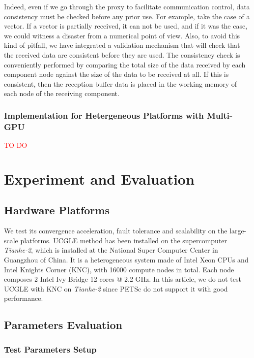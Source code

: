 Indeed, even if we go through the proxy to facilitate communication control, data consistency must be checked before any prior use. For example, take the case of a vector. If a vector is partially received, it can not be used, and if it was the case, we could witness a disaster from a numerical point of view. Also, to avoid this kind of pitfall, we have integrated a validation mechanism that will check that the received data are consistent before they are used. The consistency check is conveniently performed by comparing the total size of the data received by each component node against the size of the data to be received at all. If this is consistent, then the reception buffer data is placed in the working memory of each node of the receiving component.

\subsubsection{Implementation for Hetergeneous Platforms with Multi-GPU}

\textcolor{red}{TO DO}

\section{Experiment and Evaluation}

\subsection{Hardware Platforms}

We test its convergence acceleration, fault tolerance and scalability on the large-scale platforms. UCGLE method has been installed on the supercomputer \textit{Tianhe-2}, which is installed at the National Super Computer Center in Guangzhou of China. It is a heterogeneous system made of Intel Xeon CPUs and Intel Knights Corner (KNC), with 16000 compute nodes in total. Each node composes 2 Intel Ivy Bridge 12 cores @ 2.2 GHz. In this article, we do not test UCGLE with KNC on \textit{Tianhe-2} since PETSc do not support it with good performance.

\subsection{Parameters Evaluation}

\subsubsection{Test Parameters Setup}

